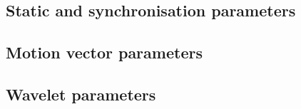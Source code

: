 


\subsection{Static and synchronisation parameters}
\subsection{Motion vector parameters}
\subsection{Wavelet parameters}
